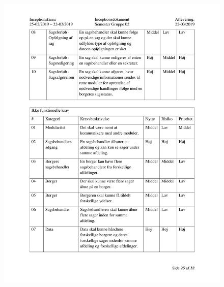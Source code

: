 \begin{figure}[hb]
  \includegraphics[scale = 0.33]{./PNG/Inceptions/Gruppe 02 + InceptionsDokument-26.jpg} 
\end{figure}

